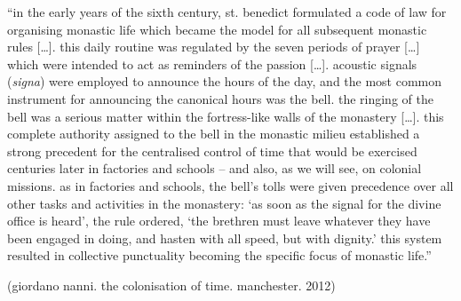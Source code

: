 \documentclass[12pt,a4paper,british,landscape]{article}
\begin{document}
{\fontsize{0.915cm}{1cm}\selectfont
``in the early years of the sixth century, st. benedict formulated a code of law for organising monastic life which became the model for all subsequent monastic rules [\dots].
this daily routine was regulated by the seven periods of prayer [\dots] which were intended to act as reminders of the passion [\dots].
acoustic signals (\emph{signa}) were employed to announce the hours of the day, and the most common instrument for announcing the canonical hours was the bell.
the ringing of the bell was a serious matter within the fortress-like walls of the monastery [\dots].
this complete authority assigned to the bell in the monastic milieu established a strong precedent for the centralised control of time that would be exercised centuries later in factories and schools – and also, as we will see, on colonial missions.
as in factories and schools, the bell’s tolls were given precedence over all other tasks and activities in the monastery:
`as soon as the signal for the divine office is heard', the rule ordered, `the brethren must leave whatever they have been engaged in doing, and hasten with all speed, but with dignity.'
this system resulted in collective punctuality becoming the specific focus of monastic life.''

\vspace{0.25cm}

\begin{center}
(giordano nanni. the colonisation of time. manchester. 2012)
\end{center}

}
\end{document}
